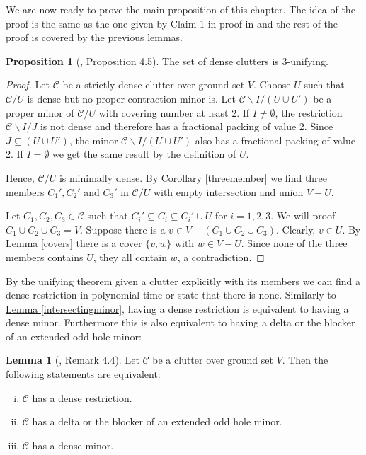 \documentclass[a4paper, 12pt]{scrbook}
\theoremstyle{definition}
\newtheorem{lemma}[theorem]{Lemma}
\newtheorem{proposition}[theorem]{Proposition}
\begin{document}
   We are now ready to prove the main proposition of this chapter.
   The idea of the proof is the same as the one given by Claim 1 in proof in \cite{restrictions} and the rest of the proof is covered by the previous lemmas.
   \begin{proposition}[\cite{restrictions}, Proposition 4.5]
       The set of dense clutters is 3-unifying.
   \end{proposition}

   \begin{proof}
       Let $\mathcal{C}$ be a strictly dense clutter over ground set $V$.
       Choose $U$ such that $\mathcal{C} / U$ is dense but no proper contraction minor is.
       Let $\mathcal{C} \backslash I / (U \cup U')$ be a proper minor of $\mathcal{C} /U$ with covering number at least 2.
       If $I \neq \emptyset$, the restriction $\mathcal{C} \backslash I / J$ is not dense and therefore has a fractional packing of value 2.
       Since $J \subseteq (U \cup U')$, the minor $\mathcal{C} \backslash I / (U \cup U')$ also has a fractional packing of value 2.
       If $I=\emptyset$ we get the same result by the definition of $U$.

       Hence, $\mathcal{C}/U$ is minimally dense.
       By \hyperref[threemember]{Corollary \ref*{threemember}} we find three members $C_1', C_2'$ and $C_3'$ in $\mathcal{C}/U$ with empty intersection and union $V - U$.

       Let $C_1, C_2, C_3 \in \mathcal{C}$ such that $C_i' \subseteq C_i \subseteq C_i' \cup U$ for $i=1,2,3$.
       We will proof $C_1 \cup C_2 \cup C_3 = V$.
       Suppose there is a $v \in V-(C_1 \cup C_2 \cup C_3)$.
       Clearly, $v \in U$.
       By \hyperref[covers]{Lemma \ref*{covers}} there is a cover $\{v,w\}$ with $w \in V-U$.
       Since none of the three members contains $U$, they all contain $w$, a contradiction.
   \end{proof}

   By the unifying theorem given a clutter explicitly with its members we can find a dense restriction in polynomial time or state that there is none. Similarly to \hyperref[intersectingminor]{Lemma \ref*{intersectingminor}}, having a dense restriction is equivalent to having a dense minor. Furthermore this is also equivalent to having a delta or the blocker of an extended odd hole minor:
   \begin{lemma}[\cite{restrictions}, Remark 4.4]
       Let $\mathcal{C}$ be a clutter over ground set $V$. Then the following statements are equivalent:
       \leavevmode
       \begin{enumerate}[(i)]
           \item $\mathcal{C}$ has a dense restriction.
           \item $\mathcal{C}$ has a delta or the blocker of an extended odd hole minor.
           \item $\mathcal{C}$ has a dense minor.
       \end{enumerate}
   \end{lemma}
\end{document}
